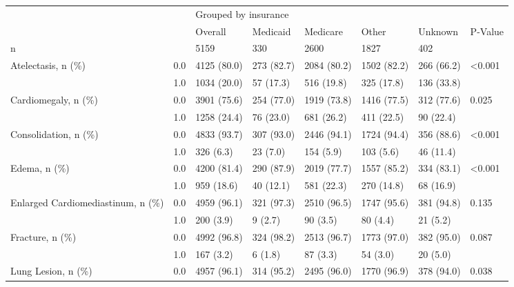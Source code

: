 \begin{tabular}{llllllll}
\toprule
                       &     & \multicolumn{6}{l}{Grouped by insurance} \\
                       &     &              Overall &    Medicaid &     Medicare &        Other &     Unknown & P-Value \\
\midrule
n & {} &                 5159 &         330 &         2600 &         1827 &         402 &         \\
Atelectasis, n (\%) & 0.0 &          4125 (80.0) &  273 (82.7) &  2084 (80.2) &  1502 (82.2) &  266 (66.2) &  <0.001 \\
                       & 1.0 &          1034 (20.0) &   57 (17.3) &   516 (19.8) &   325 (17.8) &  136 (33.8) &         \\
Cardiomegaly, n (\%) & 0.0 &          3901 (75.6) &  254 (77.0) &  1919 (73.8) &  1416 (77.5) &  312 (77.6) &   0.025 \\
                       & 1.0 &          1258 (24.4) &   76 (23.0) &   681 (26.2) &   411 (22.5) &   90 (22.4) &         \\
Consolidation, n (\%) & 0.0 &          4833 (93.7) &  307 (93.0) &  2446 (94.1) &  1724 (94.4) &  356 (88.6) &  <0.001 \\
                       & 1.0 &            326 (6.3) &    23 (7.0) &    154 (5.9) &    103 (5.6) &   46 (11.4) &         \\
Edema, n (\%) & 0.0 &          4200 (81.4) &  290 (87.9) &  2019 (77.7) &  1557 (85.2) &  334 (83.1) &  <0.001 \\
                       & 1.0 &           959 (18.6) &   40 (12.1) &   581 (22.3) &   270 (14.8) &   68 (16.9) &         \\
Enlarged Cardiomediastinum, n (\%) & 0.0 &          4959 (96.1) &  321 (97.3) &  2510 (96.5) &  1747 (95.6) &  381 (94.8) &   0.135 \\
                       & 1.0 &            200 (3.9) &     9 (2.7) &     90 (3.5) &     80 (4.4) &    21 (5.2) &         \\
Fracture, n (\%) & 0.0 &          4992 (96.8) &  324 (98.2) &  2513 (96.7) &  1773 (97.0) &  382 (95.0) &   0.087 \\
                       & 1.0 &            167 (3.2) &     6 (1.8) &     87 (3.3) &     54 (3.0) &    20 (5.0) &         \\
Lung Lesion, n (\%) & 0.0 &          4957 (96.1) &  314 (95.2) &  2495 (96.0) &  1770 (96.9) &  378 (94.0) &   0.038 \\

\end{tabular}
